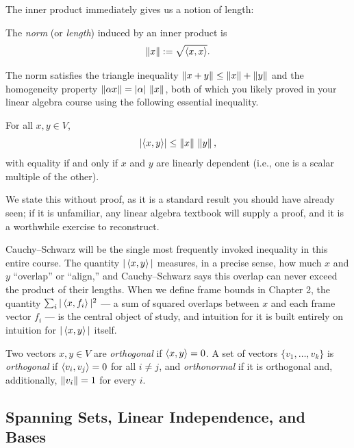 The inner product immediately gives us a notion of length:

\begin{definition}[Norm]
\label{def:norm}
The \emph{norm} (or \emph{length}) induced by an inner product is
$$
\left\| x \right\| := \sqrt{\left\langle x, x \right\rangle}.
$$
\end{definition}

The norm satisfies the triangle inequality $\left\| x+y \right\| \le \left\| x \right\| + \left\| y \right\|$ and the homogeneity property $\left\| \alpha x \right\| = |\alpha| \, \left\| x \right\|$, both of which you likely proved in your linear algebra course using the following essential inequality.

\begin{theorem}
\label{thm:cauchy-schwarz}
For all $x, y \in V$,
$$
\left| \left\langle x, y \right\rangle \right| \leq \left\| x \right\| \, \left\| y \right\|,
$$
with equality if and only if $x$ and $y$ are linearly dependent (i.e., one is a scalar multiple of the other).
\end{theorem}

We state this without proof, as it is a standard result you should have already seen; if it is unfamiliar, any linear algebra textbook will supply a proof, and it is a worthwhile exercise to reconstruct.

\begin{remark*}
Cauchy--Schwarz will be the single most frequently invoked inequality in this entire course. The quantity $|\left\langle x, y \right\rangle|$ measures, in a precise sense, how much $x$ and $y$ ``overlap'' or ``align,'' and Cauchy--Schwarz says this overlap can never exceed the product of their lengths. When we define frame bounds in Chapter 2, the quantity $\sum_i |\left\langle x, f_i \right\rangle|^2$ --- a sum of squared overlaps between $x$ and each frame vector $f_i$ --- is the central object of study, and intuition for it is built entirely on intuition for $|\left\langle x, y \right\rangle|$ itself.
\end{remark*}

\begin{definition}[Orthogonality]
\label{def:orthogonal}
Two vectors $x, y \in V$ are \emph{orthogonal} if $\left\langle x, y \right\rangle = 0$. A set of vectors $\{v_1, \dots, v_k\}$ is \emph{orthogonal} if $\left\langle v_i, v_j \right\rangle = 0$ for all $i \neq j$, and \emph{orthonormal} if it is orthogonal and, additionally, $\left\| v_i \right\| = 1$ for every $i$.
\end{definition}

\subsection{Spanning Sets, Linear Independence, and Bases}
\label{subsec:spanning-bases}

